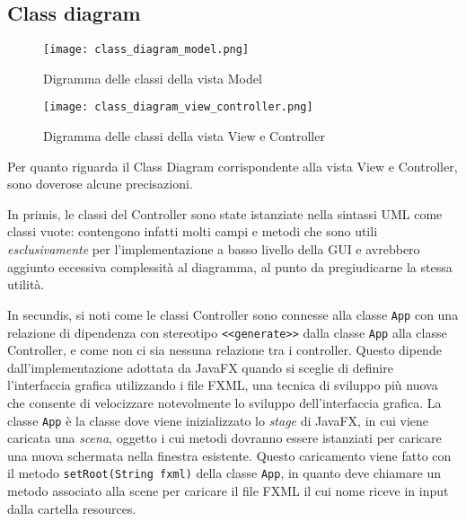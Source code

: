 \documentclass{article}
\begin{document}
\subsection{Class diagram}

\begin{center}
    \begin{figure}
        \centering
        \caption{Digramma delle classi della vista Model}
        \texttt{[image: class\_diagram\_model.png]}
    \end{figure}
\end{center}

\begin{center}
    \begin{figure}
        \centering
        \caption{Digramma delle classi della vista View e Controller}
        \texttt{[image: class\_diagram\_view\_controller.png]}
    \end{figure}
\end{center}

Per quanto riguarda il Class Diagram corrispondente alla vista View e Controller, sono doverose alcune precisazioni.

In primis, le classi del Controller sono state istanziate nella sintassi UML come classi vuote: contengono infatti molti campi e metodi che sono utili \textit{esclusivamente} per l'implementazione a basso livello della GUI e avrebbero aggiunto eccessiva complessità al diagramma, al punto da pregiudicarne la stessa utilità.

In secundis, si noti come le classi Controller sono connesse alla classe \texttt{App} con una relazione di dipendenza con stereotipo \texttt{<<generate>>} dalla classe \texttt{App} alla classe Controller, e come non ci sia nessuna relazione tra i controller. Questo dipende dall'implementazione adottata da JavaFX quando si sceglie di definire l'interfaccia grafica utilizzando i file FXML, una tecnica di sviluppo più nuova che consente di velocizzare notevolmente lo sviluppo dell'interfaccia grafica. La classe \texttt{App} è la classe dove viene inizializzato lo \textit{stage} di JavaFX, in cui viene caricata una \textit{scena}, oggetto i cui metodi dovranno essere istanziati per caricare una nuova schermata nella finestra esistente. Questo caricamento viene fatto con il metodo \texttt{setRoot(String fxml)} della classe \texttt{App}, in quanto deve chiamare un metodo associato alla scene per caricare il file FXML il cui nome riceve in input dalla cartella resources.
\end{document}
